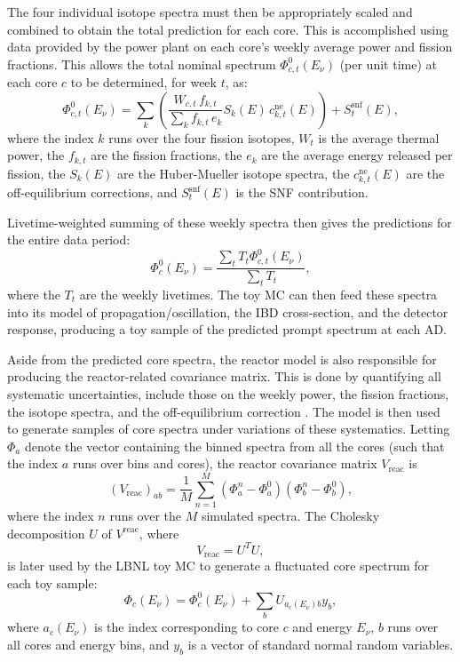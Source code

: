 \documentclass[../thesis.tex]{subfiles}
\begin{document}
The four individual isotope spectra must then be appropriately scaled and combined to obtain the total prediction for each core. This is accomplished using data provided by the power plant on each core's weekly average power and fission fractions. This allows the total nominal spectrum $\Phi^0_{c,t}(E_\nu)$ (per unit time) at each core $c$ to be determined, for week $t$, as:
\begin{equation}
  \Phi^0_{c,t}(E_\nu) = \sum_k \left( \frac{W_{c,t} \, f_{k,t}}{\sum_k f_{k,t} \, e_k}
    S_k(E) \, c^{\mathrm{ne}}_{k,t}(E) \right) + S^{\mathrm{snf}}_t(E),
\end{equation}
where the index $k$ runs over the four fission isotopes, $W_t$ is the average thermal power, the $f_{k,t}$ are the fission fractions, the $e_k$ are the average energy released per fission, the $S_k(E)$ are the Huber-Mueller isotope spectra, the $c^{\mathrm{ne}}_{k,t}(E)$ are the off-equilibrium corrections, and $S^{\mathrm{snf}}_t(E)$ is the SNF contribution.

Livetime-weighted summing of these weekly spectra then gives the predictions for the entire data period:
\begin{equation}
  \Phi^0_c(E_\nu) = \frac{\sum_t T_t \Phi^0_{c,t}(E_\nu)}{\sum_t T_t},
\end{equation}
where the $T_t$ are the weekly livetimes. The toy MC can then feed these spectra into its model of propagation/oscillation, the IBD cross-section, and the detector response, producing a toy sample of the predicted prompt spectrum at each AD.

Aside from the predicted core spectra, the reactor model is also responsible for producing the reactor-related covariance matrix. This is done by quantifying all systematic uncertainties, include those on the weekly power, the fission fractions, the isotope spectra, and the off-equilibrium correction \cite{Lewis}. The model is then used to generate samples of core spectra under variations of these systematics. Letting $\Phi_{a}$ denote the vector containing the binned spectra from all the cores (such that the index $a$ runs over bins and cores), the reactor covariance matrix $V_{\mathrm{reac}}$ is
\begin{equation}
  (V_{\mathrm{reac}})_{ab} = \frac{1}{M} \sum_{n=1}^M(\Phi^n_{a} - \Phi^0_{a})(\Phi^n_{b} - \Phi^0_{b}),
\end{equation}
where the index $n$ runs over the $M$ simulated spectra. The Cholesky decomposition $U$ of $V^{\mathrm{reac}}$, where
\begin{equation}
  V_{\mathrm{reac}} = U^TU,
\end{equation}
is later used by the LBNL toy MC to generate a fluctuated core spectrum for each toy sample:
\begin{equation}
  \label{eq:fitCholeskyUsage}
  \Phi_c(E_\nu) = \Phi^0_c(E_\nu) + \sum_b U_{a_c(E_\nu)b} y_b,
\end{equation}
where $a_c(E_\nu)$ is the index corresponding to core $c$ and energy $E_\nu$, $b$ runs over all cores and energy bins, and $y_b$ is a vector of standard normal random variables.
\end{document}
